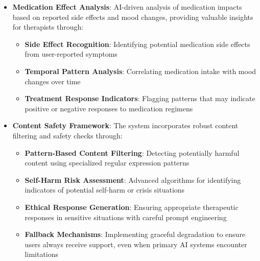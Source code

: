 \begin{itemize}
  \item \textbf{Medication Effect Analysis}: AI-driven analysis of medication impacts based on reported side effects and mood changes, providing valuable insights for therapists through:
    \begin{itemize}
      \item \textbf{Side Effect Recognition}: Identifying potential medication side effects from user-reported symptoms
      \item \textbf{Temporal Pattern Analysis}: Correlating medication intake with mood changes over time
      \item \textbf{Treatment Response Indicators}: Flagging patterns that may indicate positive or negative responses to medication regimens
    \end{itemize}
  
  \item \textbf{Content Safety Framework}: The system incorporates robust content filtering and safety checks through:
    \begin{itemize}
      \item \textbf{Pattern-Based Content Filtering}: Detecting potentially harmful content using specialized regular expression patterns
      \item \textbf{Self-Harm Risk Assessment}: Advanced algorithms for identifying indicators of potential self-harm or crisis situations
      \item \textbf{Ethical Response Generation}: Ensuring appropriate therapeutic responses in sensitive situations with careful prompt engineering
      \item \textbf{Fallback Mechanisms}: Implementing graceful degradation to ensure users always receive support, even when primary AI systems encounter limitations
    \end{itemize}
    

\end{itemize}

